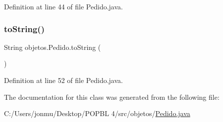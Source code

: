 Definition at line 44 of file Pedido.\+java.

\mbox{\label{classobjetos_1_1_pedido_a2db5b46450987a7f2fb289e19cf593ac}} 
\subsubsection{\texorpdfstring{to\+String()}{toString()}}
{\footnotesize\ttfamily String objetos.\+Pedido.\+to\+String (\begin{DoxyParamCaption}{ }\end{DoxyParamCaption})}



Definition at line 52 of file Pedido.\+java.



The documentation for this class was generated from the following file\+:\begin{DoxyCompactItemize}
\item 
C\+:/\+Users/jonmu/\+Desktop/\+P\+O\+P\+B\+L 4/src/objetos/\mbox{\hyperlink{_pedido_8java}{Pedido.\+java}}\end{DoxyCompactItemize}
